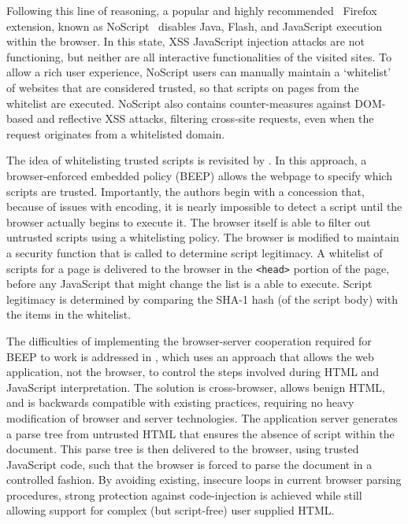 \documentclass{acmtrans2m}
\begin{document}
Following this line of reasoning, a popular and highly recommended~\cite{login} Firefox extension, known as NoScript~\cite{noscript} disables Java, Flash, and JavaScript execution within the browser.
In this state, XSS JavaScript injection attacks are not functioning, but neither are all interactive functionalities of the visited sites.
To allow a rich user experience, NoScript users can manually maintain a `whitelist' of websites that are considered trusted, so that scripts on pages from the whitelist are executed.
NoScript also contains counter-measures against DOM-based and reflective XSS attacks, filtering cross-site requests, even when the request originates from a whitelisted domain.

The idea of whitelisting trusted scripts is revisited by .
In this approach, a browser-enforced embedded policy (BEEP) allows the webpage to specify which scripts are trusted.
Importantly, the authors begin with a concession that, because of issues with encoding, it is nearly impossible to detect a script until the browser actually begins to execute it.
The browser itself is able to filter out untrusted scripts using a whitelisting policy.
The browser is modified to maintain a security function that is called to determine script legitimacy.
A whitelist of scripts for a page is delivered to the browser in the \texttt{<head>} portion of the page, before any JavaScript that might change the list is a able to execute.
Script legitimacy is determined by comparing the SHA-1 hash (of the script body) with the items in the whitelist.

The difficulties of implementing the browser-server cooperation required for BEEP to work is addressed in , which uses an approach that allows the web application, not the browser, to control the steps involved during HTML and JavaScript interpretation.
The solution is cross-browser, allows benign HTML, and is backwards compatible with existing practices, requiring no heavy modification of browser and server technologies.
The application server generates a parse tree from untrusted HTML that ensures the absence of script within the document.
This parse tree is then delivered to the browser, using trusted JavaScript code, such that the browser is forced to parse the document in a controlled fashion.
By avoiding existing, insecure loops in current browser parsing procedures, strong protection against code-injection is achieved while still allowing support for complex (but script-free) user supplied HTML.
\end{document}
